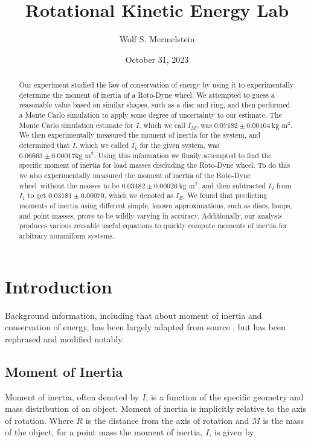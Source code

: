 \documentclass[coverpage]{article}
\title{Rotational Kinetic Energy Lab}
\date{October 31, 2023}
\author{Wolf S. Mermelstein}
\affil{Department of Physics, Case Western Reserve University, Cleveland, Ohio, 44106-7079}
\newcommand{\iUnit}{\text{kg $\text{m}^2$}}
\newcommand{\rwheel}{Roto-Dyne wheel}
\begin{document}
	
	
	\maketitle
	
	\begin{abstract}
		Our experiment studied the law of conservation of energy by using it to experimentally determine the moment of inertia of a \rwheel. We attempted to guess a reasonable value based on similar shapes, such as a disc and ring, and then performed a Monte Carlo simulation to apply some degree of uncertainty to our estimate. The Monte Carlo simulation estimate for $I$, which we call $I_M$, was $0.07182 \pm 0.00104\ \iUnit$. We then experimentally measured the moment of inertia for the system, and determined that $I$, which we called $I_1$ for the given system, was $0.06663 \pm 0.00017 \iUnit$. Using this information we finally attempted to find the specific moment of inertia for load masses discluding the \rwheel. To do this we also experimentally measured the moment of inertia of the \rwheel~without the masses to be $0.03482 \pm 0.00026\ \iUnit$, and then subtracted $I_2$ from $I_1$ to get $0.03181 \pm 0.00070$, which we denoted as $I_E$. We found that predicting moments of inertia using different simple, known approximations, such as discs, hoops, and point masses, prove to be wildly varying in accuracy. Additionally, our analysis produces various reusable useful equations to quickly compute moments of inertia for arbitrary nonuniform systems.
	\end{abstract}
	
	\tableofcontents
	
	\twocolumn
	
	\section{Introduction}
	
	Background information, including that about moment of inertia and conservation of energy, has been largely adapted from source \cite{labManual}, but has been rephrased and modified notably.
	
	\subsection{Moment of Inertia}
	
	Moment of inertia, often denoted by $I$, is a function of the specific geometry and mass distribution of an object. Moment of inertia is implicitly relative to the axis of rotation. Where $R$ is the distance from the axis of rotation and $M$ is the mass of the object, for a point mass the moment of inertia, $I$, is given by
	
\end{document}
